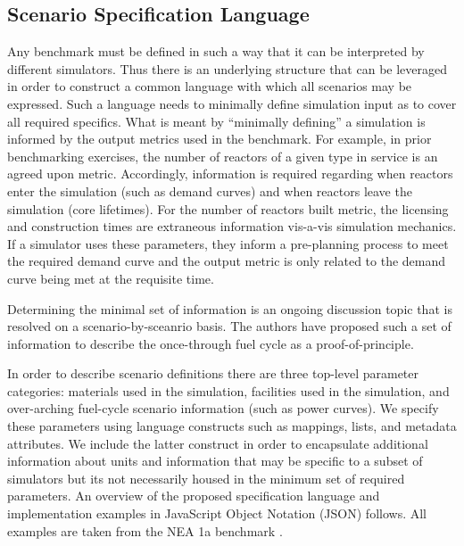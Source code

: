 \documentclass{anstrans}
\begin{document}
\subsection{Scenario Specification Language}
Any benchmark must be defined in such a way that it can be interpreted by
different simulators. Thus there is an underlying structure that can be
leveraged in order to construct a common language with which all scenarios
may be expressed. Such a language needs to minimally define simulation input as
to cover all required specifics. What is meant by ``minimally defining'' a
simulation is informed by the output metrics used in the benchmark. For example,
in prior benchmarking exercises, the number of reactors of a given type in
service is an agreed upon metric. Accordingly, information is required regarding
when reactors enter the simulation (such as demand curves) and when reactors leave
the simulation (core lifetimes). For the number of reactors built metric, 
the licensing and construction times are extraneous information vis-a-vis 
simulation mechanics. If a simulator uses these parameters, they inform a 
pre-planning process to meet the required demand curve and the output metric 
is only related to the demand curve being met at the requisite time.

Determining the minimal set of information is an ongoing discussion topic
that is resolved on a scenario-by-sceanrio basis. The authors have proposed such
a set of information to describe the once-through fuel cycle as a
proof-of-principle. 

In order to describe scenario definitions there are three top-level
parameter categories: materials used in the simulation, facilities used in
the simulation, and over-arching fuel-cycle scenario information (such as power
curves). We specify these parameters using language constructs such as
mappings, lists, and metadata attributes. We include the latter construct in order to
encapsulate additional information about units and information that may be
specific to a subset of simulators but its not necessarily housed in the minimum
set of required parameters. An overview of the proposed specification
language and implementation examples in JavaScript Object Notation
(JSON) \cite{_json_2001} follows. All examples are taken from the NEA 1a
benchmark \cite{boucher_specification_2008}.
\end{document}
